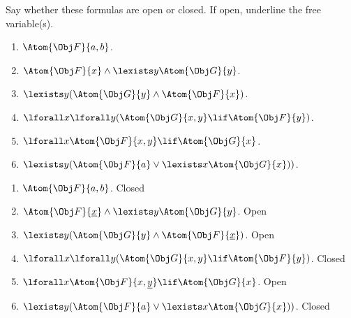 \documentclass[../../../../include/open-logic-section]{subfiles}
\begin{document}
\begin{prob}
Say whether these formulas are open
or closed. If open, underline the free variable(s).
\begin{enumerate}
\item $\Atom{\Obj F}{a,b}$. 
\item $\Atom{\Obj F}{x}\land\lexists y\Atom{\Obj G}{y}$. 
\item $\lexists y(\Atom{\Obj G}{y}\land \Atom{\Obj F}{x})$. 
\item $\lforall x\lforall y(\Atom{\Obj G}{x,y}\lif \Atom{\Obj F}{y})$. 
\item $\lforall x\Atom{\Obj F}{x,y}\lif \Atom{\Obj G}{x}$. 
\item $\lexists y(\Atom{\Obj F}{a}\lor\lexists x\Atom{\Obj G}{x}))$.
\end{enumerate}
\begin{ans}
\begin{enumerate}
	\item $\Atom{\Obj F}{a,b}$. Closed
	\item $\Atom{\Obj F}{\underline{x}}\land\lexists y\Atom{\Obj G}{y}$. Open
	\item $\lexists y(\Atom{\Obj G}{y}\land \Atom{\Obj F}{\underline{x}})$. Open 
	\item $\lforall x\lforall y(\Atom{\Obj G}{x,y}\lif \Atom{\Obj F}{y})$. Closed
	\item $\lforall x\Atom{\Obj F}{x,\underline{y}}\lif \Atom{\Obj G}{x}$. Open
	\item $\lexists y(\Atom{\Obj F}{a}\lor\lexists x\Atom{\Obj G}{x}))$. Closed
\end{enumerate}
\end{ans}
\end{prob}
\end{document}
